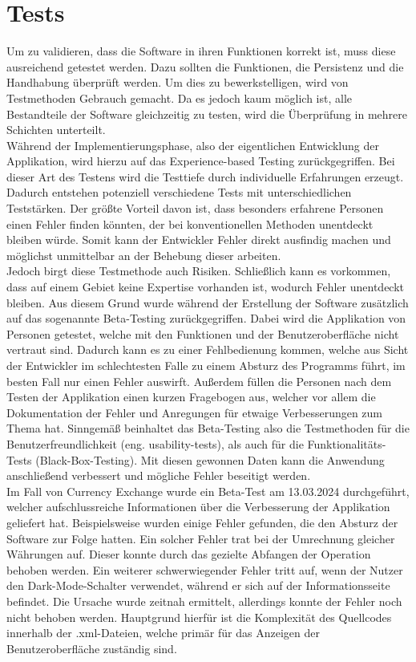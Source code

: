\documentclass[conference]{IEEEtran}
\begin{document}
\section{Tests}
Um zu validieren, dass die Software in ihren Funktionen korrekt ist, muss diese ausreichend getestet werden. Dazu sollten die Funktionen, die Persistenz und die Handhabung überprüft werden. Um dies zu bewerkstelligen, wird von Testmethoden Gebrauch gemacht. Da es jedoch kaum möglich ist, alle Bestandteile der Software gleichzeitig zu testen, wird die Überprüfung in mehrere Schichten unterteilt.\\
Während der Implementierungsphase, also der eigentlichen Entwicklung der Applikation, wird hierzu auf das Experience-based Testing zurückgegriffen. Bei dieser Art des Testens wird die Testtiefe durch individuelle Erfahrungen erzeugt. Dadurch entstehen potenziell verschiedene Tests mit unterschiedlichen Teststärken. Der größte Vorteil davon ist, dass besonders erfahrene Personen einen Fehler finden könnten, der bei konventionellen Methoden unentdeckt bleiben würde. Somit kann der Entwickler Fehler direkt ausfindig machen und möglichst unmittelbar an der Behebung dieser arbeiten.\\
Jedoch birgt diese Testmethode auch Risiken. Schließlich kann es vorkommen, dass auf einem Gebiet keine Expertise vorhanden ist, wodurch Fehler unentdeckt bleiben. Aus diesem Grund wurde während der Erstellung der Software zusätzlich auf das sogenannte Beta-Testing zurückgegriffen. Dabei wird die Applikation von Personen getestet, welche mit den Funktionen und der Benutzeroberfläche nicht vertraut sind. Dadurch kann es zu einer Fehlbedienung kommen, welche aus Sicht der Entwickler im schlechtesten Falle zu einem Absturz des Programms führt, im besten Fall nur einen Fehler auswirft. Außerdem füllen die Personen nach dem Testen der Applikation einen kurzen Fragebogen aus, welcher vor allem die Dokumentation der Fehler und Anregungen für etwaige Verbesserungen zum Thema hat. Sinngemäß beinhaltet das Beta-Testing also die Testmethoden für die Benutzerfreundlichkeit (eng. usability-tests), als auch für die Funktionalitäts-Tests (Black-Box-Testing). Mit diesen gewonnen Daten kann die Anwendung anschließend verbessert  und mögliche Fehler beseitigt werden. \\
Im Fall von Currency Exchange wurde ein Beta-Test am 13.03.2024 durchgeführt, welcher aufschlussreiche Informationen über die Verbesserung der Applikation geliefert hat. Beispielsweise wurden einige Fehler gefunden, die den Absturz der Software zur Folge hatten. Ein solcher Fehler trat bei der Umrechnung gleicher Währungen auf. Dieser konnte durch das gezielte Abfangen der Operation behoben werden. Ein weiterer schwerwiegender Fehler tritt auf, wenn der Nutzer den Dark-Mode-Schalter verwendet, während er sich auf der Informationsseite befindet. Die Ursache wurde zeitnah ermittelt, allerdings konnte der Fehler noch nicht behoben werden. Hauptgrund hierfür ist die Komplexität des Quellcodes innerhalb der .xml-Dateien, welche primär für das Anzeigen der Benutzeroberfläche zuständig sind.\\
\end{document}
